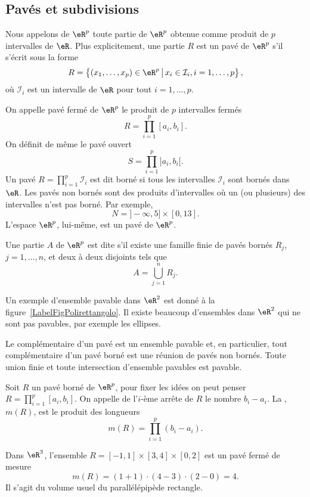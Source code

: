 \subsection{Pavés et subdivisions}

\begin{definition}
 Nous appelons  de $\eR^p$ toute partie de $\eR^p$ obtenue comme produit de $p$ intervalles de $\eR$. Plus explicitement, une partie $R$ est un pavé de $\eR^p$ s'il s'écrit sous la forme
\[
R=\left\{(x_1,\ldots, x_p)\in\eR^p \,\big\vert\,x_i\in \mathcal{I}_i,  i=1,\ldots, p  \right\},
\]
où $\mathcal{I}_i$ est un intervalle de $\eR$ pour tout $i=1,\ldots, p$.
\end{definition}
On appelle pavé fermé de $\eR^p$ le produit de $p$ intervalles fermés
\[
R=\prod_{i=1}^{p}[a_i,b_i].
\]
On définit de même le pavé ouvert
\[
S=\prod_{i=1}^{p}]a_i,b_i[.
\]
Un pavé $ R=\prod_{i=1}^{p}\mathcal{I}_i$ est dit borné si tous les intervalles $\mathcal{I}_i$ sont bornés dans $\eR$. Les pavés non bornés sont des produits d'intervalles où un (ou plusieurs) des intervalles n'est pas borné. Par exemple,
\[
N=]-\infty, 5]\times [0,13].
\]
L'espace $\eR^p$, lui-même, est un pavé de $\eR^p$.
\begin{definition}
  Une partie $A$ de $\eR^p$ est dite   s'il existe une famille finie de pavés bornés $R_j$, $j=1,\ldots, n$, et deux à deux disjoints tels que
\[
A=\bigcup_{j=1}^{n}R_j.
\]
\end{definition}
Un exemple d'ensemble pavable dans $\eR^2$ est donné à la figure~\ref{LabelFigPolirettangolo}. Il existe beaucoup d'ensembles dans $\eR^2$ qui ne sont pas pavables, par exemple les ellipses.
\newcommand{\CaptionFigPolirettangolo}{Un ensemble pavable.}


Le complémentaire d'un pavé est  un ensemble pavable et, en particulier, tout complémentaire d'un pavé borné est une réunion de  pavés non bornés. Toute union finie et toute intersection d'ensemble pavables est pavable.
\begin{definition}
	Soit $R$ un pavé borné de $\eR^p$, pour fixer les idées on peut penser $R=\prod_{i=1}^{p}[a_i,b_i]$. On appelle  de l'$i$-ème arrête de $R$ le nombre $b_i-a_i$. La , $m(R)$, est le produit des longueurs
\[
m(R)=\prod_{i=1}^{p}(b_i-a_i).
\]
\end{definition}
\begin{example}
  Dans $\eR^3$, l'ensemble $R=[-1,1]\times[3,4]\times[0,2]$ est un pavé fermé de mesure
\[
m(R)= (1+1)\cdot(4-3)\cdot(2-0)=4.
\]
Il s'agit du volume usuel du parallélépipède rectangle.
\end{example}

